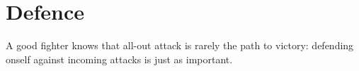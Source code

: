 
\section{Defence}\label{S:Accuracy}\label{S:Defence}

A good fighter knows that all-out attack is rarely the path to victory: defending onself against incoming attacks is just as important. 

